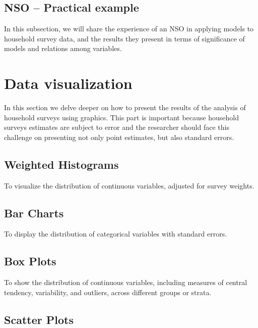 \documentclass[
  12pt,
]{book}
\begin{document}
\hypertarget{nso-practical-example-2}{%
\section{NSO -- Practical example}\label{nso-practical-example-2}}

In this subsection, we will share the experience of an NSO in applying models to household survey data, and the results they present in terms of significance of models and relations among variables.

\hypertarget{data-visualization}{%
\chapter{Data visualization}\label{data-visualization}}

In this section we delve deeper on how to present the results of the analysis of household surveys using graphics. This part is important because household surveys estimates are subject to error and the researcher should face this challenge on presenting not only point estimates, but also standard errors.

\hypertarget{weighted-histograms}{%
\section{Weighted Histograms}\label{weighted-histograms}}

To visualize the distribution of continuous variables, adjusted for survey weights.

\hypertarget{bar-charts}{%
\section{Bar Charts}\label{bar-charts}}

To display the distribution of categorical variables with standard errors.

\hypertarget{box-plots}{%
\section{Box Plots}\label{box-plots}}

To show the distribution of continuous variables, including measures of central tendency, variability, and outliers, across different groups or strata.

\hypertarget{scatter-plots}{%
\section{Scatter Plots}\label{scatter-plots}}
\end{document}
